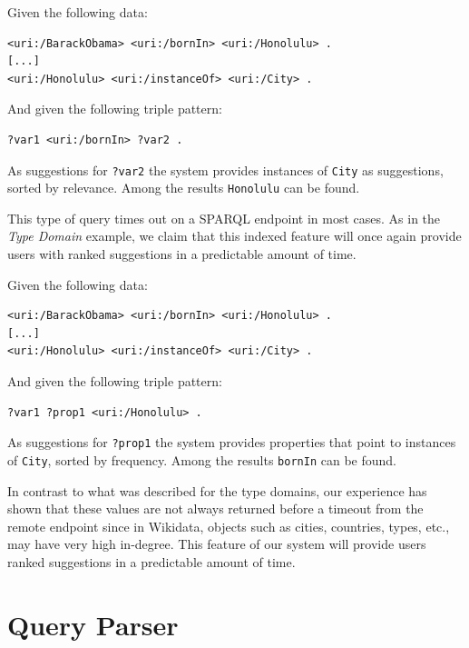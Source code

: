 \begin{example}
Given the following data:
\begin{verbatim}
<uri:/BarackObama> <uri:/bornIn> <uri:/Honolulu> .
[...]
<uri:/Honolulu> <uri:/instanceOf> <uri:/City> .
\end{verbatim}

And given the following triple pattern:
\begin{verbatim}
?var1 <uri:/bornIn> ?var2 .
\end{verbatim}

As suggestions for \texttt{?var2} the system provides instances of \texttt{City} as suggestions, sorted by relevance. Among the results \texttt{Honolulu} can be found.

This type of query times out on a SPARQL endpoint in most cases. As in the \textit{Type Domain} example, we claim that this indexed feature will once again provide users with ranked suggestions in a predictable amount of time.
\end{example}

\begin{example}
Given the following data:
\begin{verbatim}
<uri:/BarackObama> <uri:/bornIn> <uri:/Honolulu> .
[...]
<uri:/Honolulu> <uri:/instanceOf> <uri:/City> .
\end{verbatim}

And given the following triple pattern:
\begin{verbatim}
?var1 ?prop1 <uri:/Honolulu> .
\end{verbatim}

As suggestions for \texttt{?prop1} the system provides properties that point to instances of \texttt{City}, sorted by frequency. Among the results \texttt{bornIn} can be found.

In contrast to what was described for the type domains, our experience has shown that these values are not always returned before a timeout from the remote endpoint since in Wikidata, objects such as cities, countries, types, etc., may have very high in-degree. This feature of our system will provide users ranked suggestions in a predictable amount of time.
\end{example}

\section{Query Parser}
\label{chap:parser}

